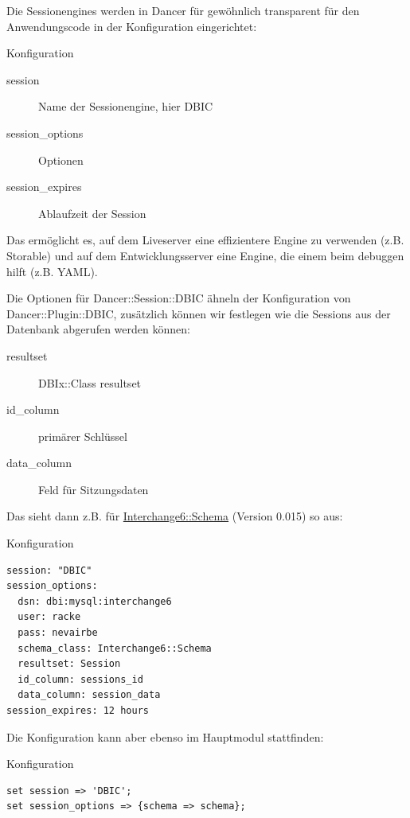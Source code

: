 Die Sessionengines werden in Dancer für gewöhnlich transparent
für den Anwendungscode in der Konfiguration eingerichtet:

\begin{frame}{Konfiguration}
\begin{description}
\item[session] Name der Sessionengine, hier DBIC
\item[session\_options] Optionen
\item[session\_expires] Ablaufzeit der Session
\end{description}
\end{frame}

Das ermöglicht es, auf dem Liveserver eine effizientere Engine
zu verwenden (z.B. Storable) und auf dem Entwicklungsserver
eine Engine, die einem beim debuggen hilft (z.B. YAML).

Die Optionen für Dancer::Session::DBIC ähneln der Konfiguration von
Dancer::Plugin::DBIC, zusätzlich können wir festlegen wie
die Sessions aus der Datenbank abgerufen werden können:

\begin{description}
\item[resultset] DBIx::Class resultset
\item[id\_column] primärer Schlüssel
\item[data\_column] Feld für Sitzungsdaten 
\end{description}

Das sieht dann z.B. für \href{https://metacpan.org/pod/Interchange6::Schema}{Interchange6::Schema} (Version 0.015) so aus:

\begin{frame}[fragile]{Konfiguration}
\begin{lstlisting}
session: "DBIC"
session_options:
  dsn: dbi:mysql:interchange6
  user: racke
  pass: nevairbe
  schema_class: Interchange6::Schema
  resultset: Session
  id_column: sessions_id
  data_column: session_data
session_expires: 12 hours
\end{lstlisting}
\end{frame}

Die Konfiguration kann aber ebenso im Hauptmodul
stattfinden:

\begin{frame}[fragile]{Konfiguration}
\begin{lstlisting}
set session => 'DBIC';
set session_options => {schema => schema};
\end{lstlisting}
\end{frame}

